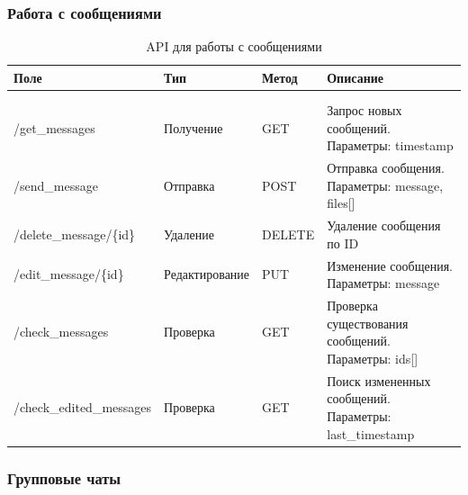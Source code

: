 \subsubsection{Работа с сообщениями}

\begin{xltabular}{\textwidth}{|l|l|p{1.7cm}|X|}
	\caption{API для работы с сообщениями}\label{tab:messages_api} \\ \hline
	\centrow Поле & \centrow Тип & \centrow Метод & \centrow Описание \\ \hline
	 &  &  &  \\ \hline
	\endfirsthead
	 &  &  &  \\ \hline
	\finishhead
	/get\_messages & Получение & GET & Запрос новых сообщений. Параметры: timestamp \\ \hline 
	/send\_message & Отправка & POST & Отправка сообщения. Параметры: message, files[] \\ \hline 
	/delete\_message/\{id\} & Удаление & DELETE & Удаление сообщения по ID \\ \hline 
	/edit\_message/\{id\} & Редактирование & PUT & Изменение сообщения. Параметры: message \\ \hline 
	/check\_messages & Проверка & GET & Проверка существования сообщений. Параметры: ids[] \\ \hline 
	/check\_edited\_messages & Проверка & GET & Поиск измененных сообщений. Параметры: last\_timestamp \\ \hline 
\end{xltabular}

\subsubsection{Групповые чаты}

